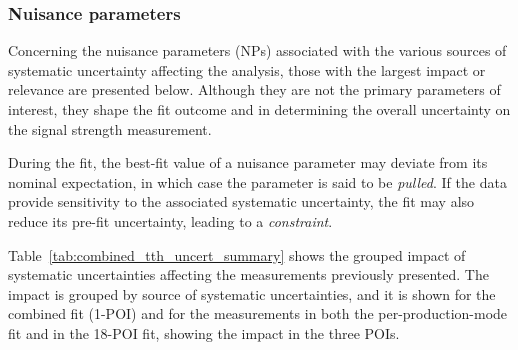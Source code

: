 
\subsubsection*{Nuisance parameters}
\label{nps}

Concerning the nuisance parameters (NPs) associated with the various sources of systematic uncertainty affecting the analysis, those with the largest impact or relevance are presented below.
Although they are not the primary parameters of interest, they shape the fit outcome and in determining the overall uncertainty on the signal strength measurement. 

During the fit, the best-fit value of a nuisance parameter may deviate from its nominal expectation, in which case the parameter is said to be \emph{pulled}. 
If the data provide sensitivity to the associated systematic uncertainty, the fit may also reduce its pre-fit uncertainty, leading to a \emph{constraint}. 

Table~\ref{tab:combined_tth_uncert_summary} shows the grouped impact of systematic uncertainties affecting the measurements previously presented. The impact is grouped by source of systematic uncertainties, and it is shown for the 
combined fit (1-POI) and for the \ttH measurements in both the per-production-mode fit and in the 18-POI fit, showing the impact in the three \ttH POIs.

